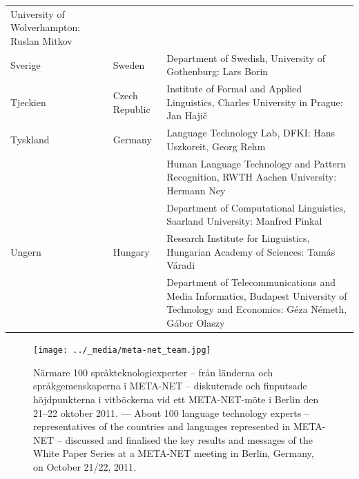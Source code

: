 \begin{longtable}{llp{113mm}}
  University of Wolverhampton: Ruslan Mitkov \\ \addlinespace  
  Sverige & \textcolor{grey1}{Sweden} & Department of Swedish, University of Gothenburg: Lars Borin \\ \addlinespace
  Tjeckien & \textcolor{grey1}{Czech Republic} & Institute of Formal and Applied Linguistics, Charles University in Prague: Jan Hajič \\ \addlinespace
  Tyskland & \textcolor{grey1}{Germany} & Language Technology Lab, DFKI: Hans Uszkoreit, Georg Rehm\\ \addlinespace
  & & Human Language Technology and Pattern Recognition, RWTH Aachen University: Hermann Ney \\ \addlinespace
  & & Department of Computational Linguistics, Saarland University: Manfred Pinkal\\ \addlinespace   
  Ungern & \textcolor{grey1}{Hungary} & Research Institute for Linguistics, Hungarian Academy of Sciences: Tamás Váradi\\  \addlinespace
  & & Department of Telecommunications and Media Informatics, Budapest University of Technology and Economics: Géza Németh, Gábor Olaszy
\end{longtable}
\normalsize

\renewcommand*{\figureformat}{}
\renewcommand*{\captionformat}{}

\begin{figure}[htbp]
  \center
  \texttt{[image: ../\_media/meta-net\_team.jpg]}
  \caption{Närmare 100 språkteknologiexperter -- från länderna och
    språkgemenskaperna i META-NET -- diskuterade och finputsade
    höjdpunkterna i vitböckerna vid ett META-NET-möte i Berlin den
    21--22 oktober 2011. --- \textcolor{grey1}{About 100 language
      technology experts -- representatives of the countries and
      languages represented in META-NET -- discussed and finalised the
      key results and messages of the White Paper Series at a META-NET
      meeting in Berlin, Germany, on October 21/22, 2011.}}
\end{figure}

\cleardoublepage

\label{whitepaperseries}

